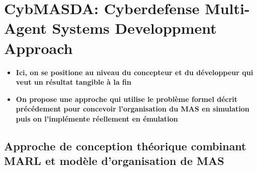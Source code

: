 \chapter{CybMASDA: Cyberdefense Multi-Agent Systems Developpment Approach}\label{ch:cybmasda} %

\begin{itemize}
  \item \textbf{Ici, on se positione au niveau du concepteur et du développeur qui veut un résultat tangible à la fin}
  \item \textbf{On propose une approche qui utilise le problème formel décrit précédement pour concevoir l'organisation du MAS en simulation puis on l'implémente réellement en émulation}
\end{itemize}

\section{Approche de conception théorique combinant MARL et modèle d'organisation de MAS}

